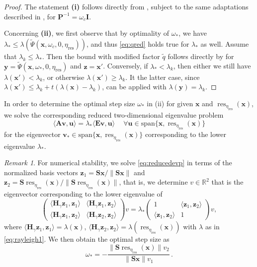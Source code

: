\documentclass[a4paper,11pt,oneside]{amsart}
\providecommand{\norm}[1]{\lVert#1\rVert}
\theoremstyle{definition}
\theoremstyle{remark}
\newtheorem{remark}[theorem]{Remark}
\newcommand{\A}{\ten A}
\newcommand{\E}{\ten E}
\newcommand{\R}{\mathbb{R}}
\newcommand{\ten}[1]{\boldsymbol{#1}}
\newcommand{\etares}{\eta_{\mathrm{res}}}
\numberwithin{equation}{section}
\numberwithin{theorem}{section}
\begin{document}
\begin{proof}
 The statement \textbf{(i)} follows directly from \cite[Theorem 3]{Rohwedder:11}, subject to the same adaptations described in , for $\ten P^{-1} = \omega_c \ten I$.

 Concerning \textbf{(ii)}, we first observe that by optimality of $\omega_\ast$, we have $\lambda_\ast \leq \lambda (\tilde \Psi(\ten x, \omega_c, 0, \etares))$, and thus \eqref{eq:qred} holds true for $\lambda_\ast$ as well. Assume that $\lambda_k \leq \lambda_\ast$. Then the bound with modified factor $\tilde q$ follows directly by  for $\ten y = \tilde \Psi(\ten x, \omega_\ast, 0, \etares)$ and $\ten z = \ten x'$. Conversely, if $\lambda_\ast < \lambda_k$, then either we still have $\lambda(\ten x') < \lambda_k$, or otherwise $\lambda(\ten x') \geq \lambda_k$. It the latter case, since $\lambda (\ten x') \leq \lambda_k + t (\lambda(\ten x) - \lambda_k)$,  can be applied with $\lambda(\ten y) = \lambda_k$.
\end{proof}


In order to determine the optimal step size $\omega_\ast$ in (ii)
for given $\ten x$ and $\operatorname{res}_{\etares}(\ten x)$, we solve the corresponding reduced two-dimensional eigenvalue problem
\begin{equation}\label{eq:reducedevp}
 \langle \A \ten v, \ten u \rangle = \lambda_\ast \langle\E \ten v, \ten u \rangle \quad \ \forall \ten u \in \mathrm{span}\{\ten x, \operatorname{res}_{\etares}(\ten x)\}
\end{equation}
for the eigenvector $\ten v_* \in \mathrm{span}\{\ten x, \operatorname{res}_{\etares}(\ten x)\}$ corresponding to the lower eigenvalue $\lambda_\ast$. 

\begin{remark}\label{omegamin}
For numerical stability, we solve \eqref{eq:reducedevp} in terms of the normalized basis vectors $\ten z_1 = \ten S \ten x / \norm{\ten S  \ten x}$ and $\ten z_2 = \ten S  \operatorname{res}_{\etares}(\ten x) / \norm{\ten S  \operatorname{res}_{\etares}(\ten x)}$, that is, we determine $v \in \R^2$ that is the eigenvector corresponding to the lower eigenvalue of
\[   \begin{pmatrix}
\langle \ten H_\gamma \ten z_1, \ten z_1\rangle & \langle \ten H_\gamma \ten z_1, \ten z_2 \rangle \\
 \langle \ten H_\gamma \ten z_1, \ten z_2 \rangle & \langle \ten H_\gamma \ten z_2, \ten z_2 \rangle
\end{pmatrix}
v 
=
\lambda_\ast
\begin{pmatrix}
1 & \langle \ten z_1, \ten z_2 \rangle \\
 \langle \ten z_1, \ten z_2 \rangle & 1
\end{pmatrix}
 v ,
\]
where $\langle \ten H_\gamma \ten z_1, \ten z_1 \rangle =\lambda(\ten x)$, $\langle \ten H_\gamma \ten z_2, \ten z_2 \rangle=\lambda(\operatorname{res}_{\etares}(\ten x) )$ with $\lambda$ as in \eqref{eq:rayleigh1}. We then obtain the optimal step size as
\[
\omega_\ast = - \frac{\norm{\ten S  \operatorname{res}_{\etares}(\ten x)} v_2}{\norm{\ten S  \ten x} v_1}\,.
\]
\end{remark}
\end{document}
